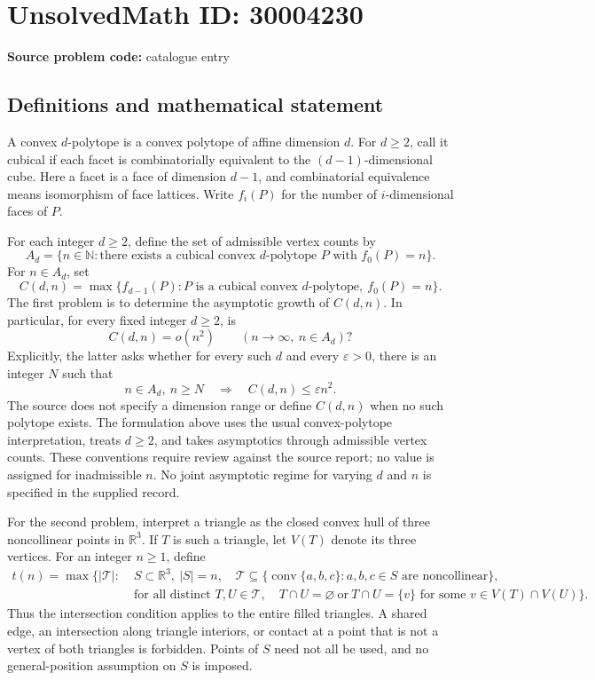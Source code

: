 \documentclass[11pt]{article}
\newcommand{\N}{\mathbb{N}}
\newcommand{\R}{\mathbb{R}}
\begin{document}
\section*{UnsolvedMath ID: 30004230}
\textbf{Source problem code:} catalogue entry
\subsection{Definitions and mathematical statement}
A convex \(d\)-polytope is a convex polytope of affine dimension \(d\). For \(d\geq 2\), call it cubical if each facet is combinatorially equivalent to the \((d-1)\)-dimensional cube. Here a facet is a face of dimension \(d-1\), and combinatorial equivalence means isomorphism of face lattices. Write \(f_i(P)\) for the number of \(i\)-dimensional faces of \(P\).

For each integer \(d\geq 2\), define the set of admissible vertex counts by
\[
 A_d=\{n\in\N: \text{there exists a cubical convex }d\text{-polytope }P\text{ with }f_0(P)=n\}.
\]
For \(n\in A_d\), set
\[
 C(d,n)=\max\{f_{d-1}(P): P\text{ is a cubical convex }d\text{-polytope},\ f_0(P)=n\}.
\]
The first problem is to determine the asymptotic growth of \(C(d,n)\). In particular, for every fixed integer \(d\geq 2\), is
\[
 C(d,n)=o(n^2)\qquad(n\to\infty,\ n\in A_d)?
\]
Explicitly, the latter asks whether for every such \(d\) and every \(\varepsilon>0\), there is an integer \(N\) such that
\[
 n\in A_d,\ n\geq N\quad\Longrightarrow\quad C(d,n)\leq\varepsilon n^2.
\]
The source does not specify a dimension range or define \(C(d,n)\) when no such polytope exists. The formulation above uses the usual convex-polytope interpretation, treats \(d\geq2\), and takes asymptotics through admissible vertex counts. These conventions require review against the source report; no value is assigned for inadmissible \(n\). No joint asymptotic regime for varying \(d\) and \(n\) is specified in the supplied record.

For the second problem, interpret a triangle as the closed convex hull of three noncollinear points in \(\R^3\). If \(T\) is such a triangle, let \(V(T)\) denote its three vertices. For an integer \(n\geq1\), define
\[
\begin{split}
 t(n)=\max\bigl\{|\mathcal T|:\;&S\subset\R^3,\ |S|=n,\quad
 \mathcal T\subseteq\{\operatorname{conv}\{a,b,c\}:a,b,c\in S\text{ are noncollinear}\},\\
 &\text{for all distinct }T,U\in\mathcal T,\quad
 T\cap U=\varnothing\ \text{or}\ 
 T\cap U=\{v\}\text{ for some }v\in V(T)\cap V(U)\bigr\}.
\end{split}
\]
Thus the intersection condition applies to the entire filled triangles. A shared edge, an intersection along triangle interiors, or contact at a point that is not a vertex of both triangles is forbidden. Points of \(S\) need not all be used, and no general-position assumption on \(S\) is imposed.
\end{document}
